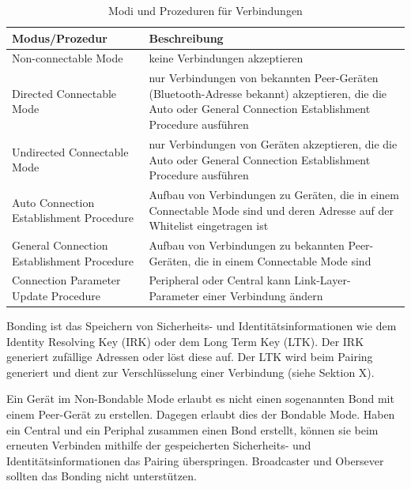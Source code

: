 \begin{table}
    \begin{tabularx}{\textwidth}{|p{4.5cm}|X|}
    \hline
    \textbf{Modus/Prozedur} & \textbf{Beschreibung} \\
    \hline
    Non-connectable Mode & keine Verbindungen akzeptieren \\
    \hline
    Directed Connectable Mode & nur Verbindungen von bekannten Peer-Geräten (Bluetooth-Adresse bekannt) akzeptieren, die die Auto oder General Connection Establishment Procedure ausführen \\
    \hline
    Undirected Connectable Mode & nur Verbindungen von Geräten akzeptieren, die die Auto oder General Connection Establishment Procedure ausführen \\
    \hline
    Auto Connection Establishment Procedure & Aufbau von Verbindungen zu Geräten, die in einem Connectable Mode sind und deren Adresse auf der Whitelist eingetragen ist \\
    \hline
    General Connection Establishment Procedure & Aufbau von Verbindungen zu bekannten Peer-Geräten, die in einem Connectable Mode sind \\
    \hline
    Connection Parameter Update Procedure & Peripheral oder Central kann Link-Layer-Parameter einer Verbindung ändern \\
    \hline
    \end{tabularx}
    \caption[Modi und Prozeduren für Verbindungen (GAP)]{Modi und Prozeduren für Verbindungen \cite{BtSpec4.0_1704-1718}}
\end{table}

Bonding ist das Speichern von Sicherheits- und Identitätsinformationen wie dem Identity Resolving Key (IRK) oder dem Long Term Key (LTK). Der IRK generiert zufällige Adressen oder löst diese auf. Der LTK wird beim Pairing generiert und dient zur Verschlüsselung einer Verbindung (siehe Sektion X). 

Ein Gerät im Non-Bondable Mode erlaubt es nicht einen sogenannten Bond mit einem Peer-Gerät zu erstellen. Dagegen erlaubt dies der Bondable Mode. Haben ein Central und ein Periphal zusammen einen Bond erstellt, können sie beim erneuten Verbinden mithilfe der gespeicherten Sicherheits- und Identitätsinformationen das Pairing überspringen. Broadcaster und Obersever sollten das Bonding nicht unterstützen. \cite{BtSpec4.2_2060-2062}

